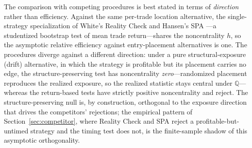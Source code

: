 \documentclass[preprint,12pt]{elsarticle}
\theoremstyle{definition}
\begin{document}
The comparison with competing procedures is best stated in terms of \emph{direction} rather than efficiency. Against the same per-trade location alternative, the single-strategy specialization of White's Reality Check \cite{white2000} and Hansen's SPA \cite{hansen2005}---a studentized bootstrap test of mean trade return---shares the noncentrality $h$, so the asymptotic relative efficiency against entry-placement alternatives is one. The procedures diverge against a different direction: under a pure structural-exposure (drift) alternative, in which the strategy is profitable but its placement carries no edge, the structure-preserving test has noncentrality \emph{zero}---randomized placement reproduces the realized exposure, so the realized statistic stays central under $\mathbb{Q}$---whereas the return-based tests have strictly positive noncentrality and reject. The structure-preserving null is, by construction, orthogonal to the exposure direction that drives the competitors' rejections; the empirical pattern of Section~\ref{sec:competitor}, where Reality Check and SPA reject a profitable-but-untimed strategy and the timing test does not, is the finite-sample shadow of this asymptotic orthogonality.
\end{document}
